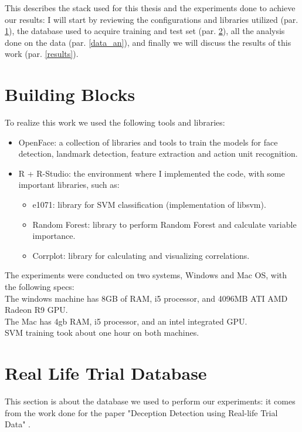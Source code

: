 This describes the stack used for this thesis and the experiments done to achieve our results: I will start by reviewing the configurations and libraries utilized (par. \ref{bb}), the database used to acquire training and test set (par. \ref{rldb}), all the analysis done on the data (par. \ref{data_an}), and finally we will discuss the results of this work (par. \ref{results}).

\section{Building Blocks} \label{bb}
To realize this work we used the following tools and libraries:
\begin{itemize}
	\item OpenFace: a collection of libraries and tools to train the models for face detection, landmark detection, feature extraction and action unit recognition.
	\item R + R-Studio: the environment where I implemented the code, with some important libraries, such as:
	\begin{itemize}
		\item e1071: library for SVM classification (implementation of libsvm).
		\item Random Forest: library to perform Random Forest and calculate variable importance.
		\item Corrplot: library for calculating and visualizing correlations.
	\end{itemize}
\end{itemize}

The experiments were conducted on two systems, Windows and Mac OS, with the following specs:\\
The windows machine has 8GB of RAM, i5 processor, and 4096MB ATI AMD Radeon R9 GPU. \\
The Mac has 4gb RAM, i5 processor, and an intel integrated GPU.\\
SVM training took about one hour on both machines.

\clearpage

\section{Real Life Trial Database} \label{rldb}
This section is about the database we used to perform our experiments: it comes from the work done for the paper "Deception Detection using Real-life Trial Data" \cite{Perez-Rosas:2015:DDU:2818346.2820758}.

